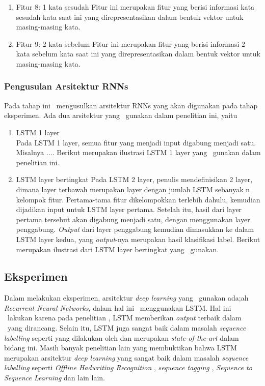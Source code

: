 \begin{enumerate}
		 \item Fitur 8: 1 kata sesudah
		 Fitur ini merupakan fitur yang berisi informasi kata sesudah kata saat ini yang direpresentasikan dalam bentuk vektor untuk masing-masing kata.
		 
		 \item Fitur 9: 2 kata sebelum
		 Fitur ini merupakan fitur yang berisi informasi 2 kata sebelum kata saat ini yang direpresentasikan dalam bentuk vektor untuk masing-masing kata.
		 
	\end{enumerate}

	\subsubsection{Pengusulan Arsitektur RNNs}
	Pada tahap ini \saya~mengusulkan arsitektur RNNs yang akan digunakan pada tahap eksperimen. Ada dua arsitektur yang \saya~gunakan dalam penelitian ini, yaitu
	\begin{enumerate}
		\item LSTM 1 layer\\
		Pada LSTM 1 layer, semua fitur yang menjadi input digabung menjadi satu. Misalnya .... Berikut merupakan ilustrasi LSTM 1 layer yang \saya~gunakan dalam penelitian ini.
		\item LSTM layer bertingkat
		Pada LSTM 2 layer, penulis mendefinisikan 2 layer, dimana layer terbawah merupakan layer dengan jumlah LSTM sebanyak n kelompok fitur. Pertama-tama fitur dikelompokkan terlebih dahulu, kemudian dijadikan input untuk LSTM layer pertama. Setelah itu, hasil dari layer pertama tersebut akan digabung menjadi satu, dengan menggunakan layer penggabung. \textit{Output} dari layer penggabung kemudian dimasukkan ke dalam LSTM layer kedua, yang \textit{output}-nya merupakan hasil klasifikasi label. Berikut merupakan ilustrasi dari LSTM layer bertingkat yang \saya~gunakan.
	\end{enumerate}
	
	\subsection{Eksperimen}
	Dalam melakukan eksperimen, arsitektur \textit{deep learning} yang \saya~gunakan ada;ah \textit{Recurrent Neural Networks}, dalam hal ini \saya~menggunakan LSTM. Hal ini \saya~lakukan karena pada penelitian \cite{mujiono2016new}, LSTM memberikan \textit{output} terbaik dalam \mer~yang dirancang. Selain itu, LSTM juga sangat baik dalam masalah \textit{sequence labelling} seperti yang dilakukan oleh \cite{graves2013speech} dan merupakan \textit{state-of-the-art} dalam bidang ini. Masih banyak penelitian lain yang membuktikan bahwa LSTM merupakan arsitektur \textit{deep learning} yang sangat baik dalam masalah \textit{sequence labelling} seperti \textit{Offline Hadwriting Recognition} \citep{graves2009offline}, \textit{sequence tagging} \citep{huang2015bidirectional}, \textit{Sequence to Sequence Learning} \citep{NIPS2014_5346} dan lain lain.
	
